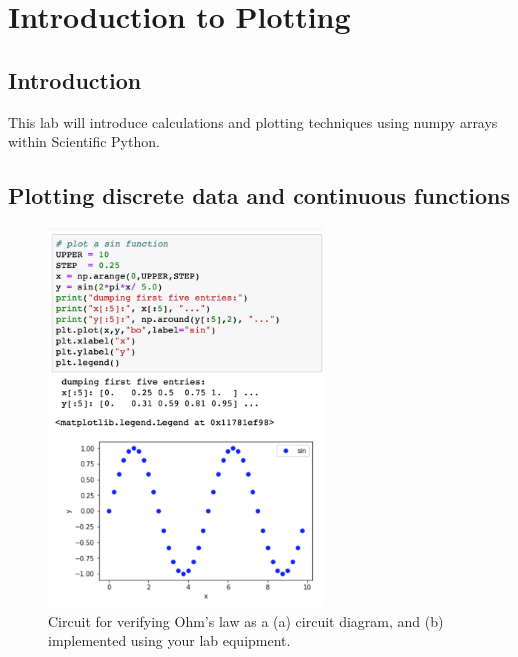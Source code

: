 \chapter{Introduction to Plotting}

\section{Introduction}
This lab will introduce calculations and plotting techniques using numpy arrays within Scientific Python.

\section{Plotting discrete data and continuous functions}

\begin{figure}[htbp]
\begin{center}
\includegraphics[width=0.65\textwidth]{figs/labs//plotting/plotting.png} 
\caption{Circuit for verifying Ohm's law as a (a) circuit diagram, and (b) implemented using your lab equipment.}
\label{fig:plotsin}
\end{center}
\end{figure}

